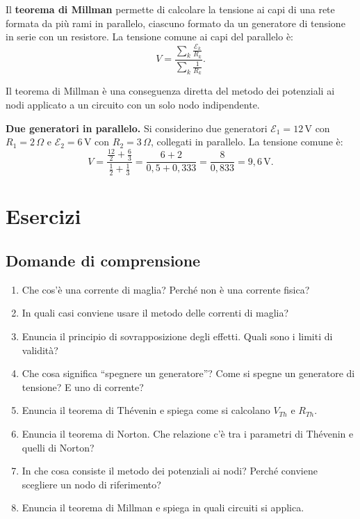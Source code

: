 \begin{concetto}
Il \textbf{teorema di Millman} permette di calcolare la tensione ai capi di una rete formata da più rami in parallelo, ciascuno formato da un generatore di tensione in serie con un resistore. La tensione comune ai capi del parallelo è:
\[
V = \frac{\sum_k \frac{\mathcal{E}_k}{R_k}}{\sum_k \frac{1}{R_k}}.
\]
\end{concetto}

Il teorema di Millman è una conseguenza diretta del metodo dei potenziali ai nodi applicato a un circuito con un solo nodo indipendente.

\begin{esempio}
\textbf{Due generatori in parallelo.} Si considerino due generatori \(\mathcal{E}_1 = 12\,\text{V}\) con \(R_1 = 2\,\Omega\) e \(\mathcal{E}_2 = 6\,\text{V}\) con \(R_2 = 3\,\Omega\), collegati in parallelo. La tensione comune è:
\[
V = \frac{\frac{12}{2} + \frac{6}{3}}{\frac{1}{2} + \frac{1}{3}} = \frac{6 + 2}{0{,}5 + 0{,}333} = \frac{8}{0{,}833} = 9{,}6\,\text{V}.
\]
\end{esempio}

\section{Esercizi}

\subsection{Domande di comprensione}

\begin{enumerate}[leftmargin=1cm]
  \item Che cos'è una corrente di maglia? Perché non è una corrente fisica?
  \item In quali casi conviene usare il metodo delle correnti di maglia?
  \item Enuncia il principio di sovrapposizione degli effetti. Quali sono i limiti di validità?
  \item Che cosa significa ``spegnere un generatore''? Come si spegne un generatore di tensione? E uno di corrente?
  \item Enuncia il teorema di Thévenin e spiega come si calcolano \(V_{Th}\) e \(R_{Th}\).
  \item Enuncia il teorema di Norton. Che relazione c'è tra i parametri di Thévenin e quelli di Norton?
  \item In che cosa consiste il metodo dei potenziali ai nodi? Perché conviene scegliere un nodo di riferimento?
  \item Enuncia il teorema di Millman e spiega in quali circuiti si applica.
\end{enumerate}


